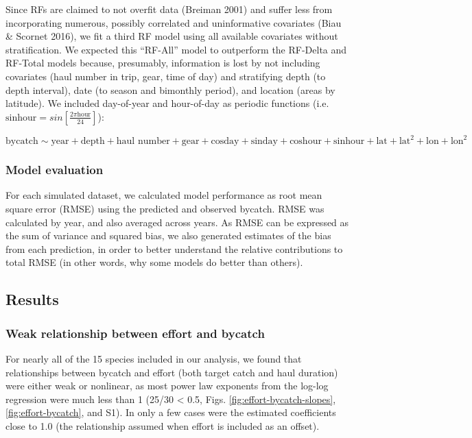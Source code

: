 \documentclass[]{article}
\begin{document}
Since RFs are claimed to not overfit data (Breiman 2001) and suffer less
from incorporating numerous, possibly correlated and uninformative
covariates (Biau \& Scornet 2016), we fit a third RF model using all
available covariates without stratification. We expected this ``RF-All''
model to outperform the RF-Delta and RF-Total models because,
presumably, information is lost by not including covariates (haul number
in trip, gear, time of day) and stratifying depth (to depth interval),
date (to season and bimonthly period), and location (areas by latitude).
We included day-of-year and hour-of-day as periodic functions (i.e.
\(\text{sinhour} = sin \left[ \frac{2 \pi \text{hour}}{24} \right]\)):

\[ \text{bycatch} \sim \text{year} + \text{depth} + \text{haul number} + \text{gear} + \text{cosday} + \text{sinday} + \text{coshour} + \text{sinhour} + \text{lat} + \text{lat}^2 + \text{lon} + \text{lon}^2\]

\hypertarget{model-evaluation}{%
\subsubsection{Model evaluation}\label{model-evaluation}}

For each simulated dataset, we calculated model performance as root mean
square error (RMSE) using the predicted and observed bycatch. RMSE was
calculated by year, and also averaged across years. As RMSE can be
expressed as the sum of variance and squared bias, we also generated
estimates of the bias from each prediction, in order to better
understand the relative contributions to total RMSE (in other words, why
some models do better than others).

\hypertarget{results}{%
\subsection{Results}\label{results}}

\hypertarget{weak-relationship-between-effort-and-bycatch}{%
\subsubsection{Weak relationship between effort and
bycatch}\label{weak-relationship-between-effort-and-bycatch}}

For nearly all of the 15 species included in our analysis, we found that
relationships between bycatch and effort (both target catch and haul
duration) were either weak or nonlinear, as most power law exponents
from the log-log regression were much less than 1 (25/30 \textless{}
0.5, Figs. \ref{fig:effort-bycatch-slopes}, \ref{fig:effort-bycatch},
and S1). In only a few cases were the estimated coefficients close to
1.0 (the relationship assumed when effort is included as an offset).
\end{document}
